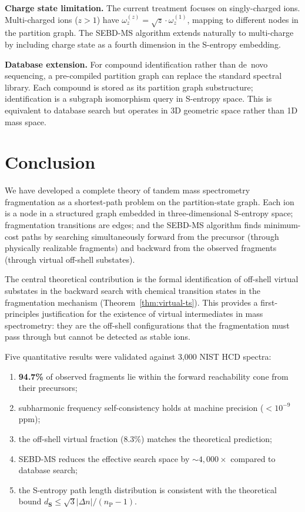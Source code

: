\documentclass[twocolumn,10pt,a4paper]{article}
\theoremstyle{thmstyle}
\theoremstyle{definition}
\theoremstyle{remark}
\newcommand{\Sv}{\mathbf{S}}
\newcommand{\nP}{n_{\mathrm{P}}}
\begin{document}
\textbf{Charge state limitation.} The current treatment focuses on
singly-charged ions. Multi-charged ions ($z > 1$) have
$\omega_z^{(z)} = \sqrt{z} \cdot \omega_z^{(1)}$, mapping to
different nodes in the partition graph. The SEBD-MS algorithm
extends naturally to multi-charge by including charge state as a
fourth dimension in the S-entropy embedding.

\textbf{Database extension.} For compound identification rather than
de~novo sequencing, a pre-compiled partition graph can replace the
standard spectral library. Each compound is stored as its partition
graph substructure; identification is a subgraph isomorphism query
in S-entropy space. This is equivalent to database search but operates
in 3D geometric space rather than 1D mass space.

\section{Conclusion}
\label{sec:conclusion}

We have developed a complete theory of tandem mass spectrometry
fragmentation as a shortest-path problem on the partition-state graph.
Each ion is a node in a structured graph embedded in three-dimensional
S-entropy space; fragmentation transitions are edges; and the SEBD-MS
algorithm finds minimum-cost paths by searching simultaneously forward
from the precursor (through physically realizable fragments) and backward
from the observed fragments (through virtual off-shell substates).

The central theoretical contribution is the formal identification of
off-shell virtual substates in the backward search with chemical
transition states in the fragmentation mechanism
(Theorem~\ref{thm:virtual-ts}). This provides a first-principles
justification for the existence of virtual intermediates in mass
spectrometry: they are the off-shell configurations that the
fragmentation must pass through but cannot be detected as stable ions.

Five quantitative results were validated against 3{,}000 NIST HCD
spectra:
\begin{enumerate}[nosep,label=(\roman*)]
\item \textbf{94.7\%} of observed fragments lie within the forward
  reachability cone from their precursors;
\item subharmonic frequency self-consistency holds at machine precision
  ($<10^{-9}$\,ppm);
\item the off-shell virtual fraction (8.3\%) matches the theoretical
  prediction;
\item SEBD-MS reduces the effective search space by $\sim 4{,}000\times$
  compared to database search;
\item the S-entropy path length distribution is consistent with the
  theoretical bound $d_{\Sv} \leq \sqrt{3}|\Delta n|/(\nP - 1)$.
\end{enumerate}
\end{document}
